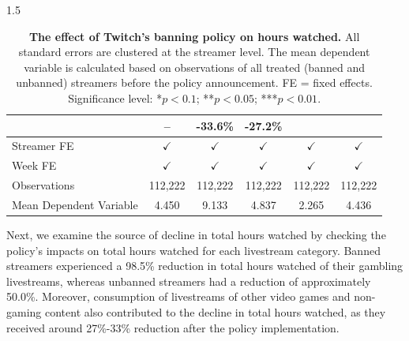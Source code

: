 \documentclass[a4paper,12pt]{article}
\begin{document}
\begin{spacing}{1.5}
\begin{table}[htb!]
\begin{threeparttable}
\begin{tabular}{lccccc}
& – 
& -33.6\% 
& -27.2\% \\ \hline
Streamer FE  & $\checkmark$ & $\checkmark$ & $\checkmark$ & $\checkmark$ & $\checkmark$ \\
Week FE      & $\checkmark$ & $\checkmark$ & $\checkmark$ & $\checkmark$ & $\checkmark$ \\
Observations & 112,222 & 112,222 & 112,222 & 112,222 & 112,222 \\
Mean Dependent Variable 
& 4.450 & 9.133 & 4.837 & 2.265 & 4.436 \\ 
\hline 
\end{tabular}
\end{threeparttable}
\caption{\textbf{The effect of Twitch’s banning policy on hours watched.} All standard errors are clustered at the streamer level. The mean dependent variable is calculated based on observations of all treated (banned and unbanned) streamers before the policy announcement. FE = fixed effects. Significance level: *$p<0.1$; **$p<0.05$; ***$p<0.01$.}
\label{ATT_hrs_watched}
\end{table}

Next, we examine the source of decline in total hours watched by checking the policy's impacts on total hours watched for each livestream category. Banned streamers experienced a 98.5\% reduction in total hours watched of their gambling livestreams, whereas unbanned streamers had a reduction of approximately 50.0\%. Moreover, consumption of livestreams of other video games and non-gaming content also contributed to the decline in total hours watched, as they received around 27\%-33\% reduction after the policy implementation. 


\end{spacing}
\end{document}
